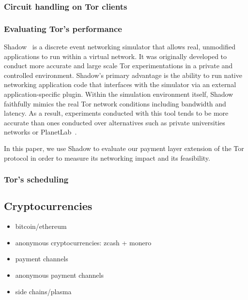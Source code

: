 \subsubsection{Circuit handling on Tor clients}

\subsubsection{Evaluating Tor's performance}
Shadow~\cite{shadow-ndss12} is a discrete event networking simulator that allows
real, unmodified applications to run within a virtual network. It was originally
developed to conduct more accurate and large scale Tor experimentations in a
private and controlled environment. Shadow's primary advantage is the ability to
run native networking application code that interfaces with the simulator via an
external application-specific plugin.   Within the simulation environment itself,
Shadow faithfully mimics the real Tor network conditions including bandwidth and
latency. As a result, experiments conducted with this tool tends to be more
accurate than ones conducted over alternatives such as private universities
networks or PlanetLab~\cite{Chun:2003:POT:956993.956995}.

In this paper, we use Shadow to evaluate our payment layer extension of the Tor
protocol in order to measure its networking impact and its feasibility.
\subsubsection{Tor's scheduling}


\subsection{Cryptocurrencies}



\begin{itemize}
\item bitcoin/ethereum~\cite{nakamoto2008bitcoin}~\cite{wood2014ethereum}
\item anonymous cryptocurrencies: zcash + monero
\item payment channels
\item anonymous payment channels
\item side chains/plasma
\end{itemize}

